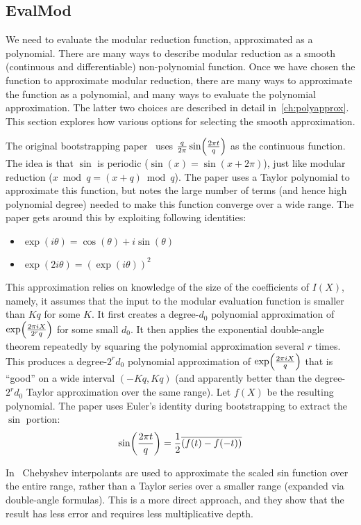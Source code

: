 \documentclass[../fheimpl.tex]{subfiles}
\begin{document}
    \subsection{EvalMod}
    We need to evaluate the modular reduction function, approximated as a polynomial. There are many ways to describe modular reduction as a smooth (continuous and differentiable) non-polynomial function. Once we have chosen the function to approximate modular reduction, there are many ways to approximate the function as a polynomial, and many ways to evaluate the polynomial approximation. The latter two choices are described in detail in~\cref{ch:polyapprox}. This section explores how various options for selecting the smooth approximation.
    
    The original bootstrapping paper~\cite{cryptoeprint:2018/153} uses $\frac{q}{2\pi}\sin\parens*{\frac{2\pi t}{q}}$ as the continuous function. The idea is that $\sin$ is periodic ($\sin(x) = \sin(x+2\pi)$), just like modular reduction ($x \bmod q = (x+q) \bmod q$). The paper uses a Taylor polynomial to approximate this function, but notes the large number of terms (and hence high polynomial degree) needed to make this function converge over a wide range. The paper gets around this by exploiting following identities:
    \begin{itemize}
        \item $\exp(i\theta) = \cos(\theta)+i\sin(\theta)$
        \item $\exp(2i\theta) = (\exp(i\theta))^2$
    \end{itemize}
    This approximation relies on knowledge of the size of the coefficients of $I(X)$, namely, it assumes that the input to the modular evaluation function is smaller than $Kq$ for some $K$. It first creates a degree-$d_0$ polynomial approximation of $\exp\parens*{\frac{2\pi iX}{2^r q}}$ for some small $d_0$. It then applies the exponential double-angle theorem repeatedly by squaring the polynomial approximation several $r$ times. This produces a degree-$2^rd_0$ polynomial approximation of $\exp\parens*{\frac{2\pi iX}{q}}$ that is ``good'' on a wide interval $(-Kq, Kq)$ (and apparently better than the degree-$2^rd_0$ Taylor approximation over the same range). Let $f(X)$ be the resulting polynomial. The paper uses Euler's identity during bootstrapping to extract the $\sin$ portion: 
    \[\sin\parens*{\frac{2\pi t}{q}} =\frac{1}{2}\overline{\parens*{f(t) - f(-t)}}\]
    
    In~\cite{cryptoeprint:2018/1043} Chebyshev interpolants are used to approximate the scaled sin function over the entire range, rather than a Taylor series over a smaller range (expanded via double-angle formulas). This is a more direct approach, and they show that the result has less error and requires less multiplicative depth.
    
\end{document}
